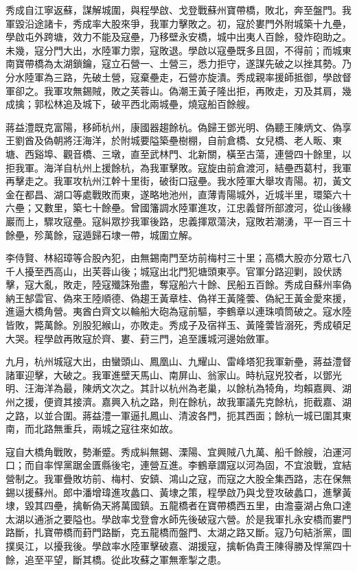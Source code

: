 \begin{pinyinscope}
秀成自江寧返蘇，謀解城圍，與程學啟、戈登戰蘇州寶帶橋，敗北，奔至盤門。我軍毀沿途諸卡，秀成率大股來爭，我軍力擊敗之。初，寇於婁門外附城築十九壘，學啟屯外跨塘，效力不能及寇壘，乃移壁永安橋，城中出夷人百餘，發炸砲助之。未幾，寇分門大出，水陸軍力禦，寇敗退。學啟以寇壘既多且固，不得前；而城東南寶帶橋為太湖鎖鑰，寇立石營一、土營三，悉力拒守，遂謀先破之以挫其勢。乃分水陸軍為三路，先破土營，寇棄壘走，石營亦旋潰。秀成親率援師抵御，學啟督軍卻之。我軍攻無錫賊，敗之芙蓉山。偽潮王黃子隆出拒，再敗走，刃及其肩，幾成擒；郭松林追及城下，破平西北兩城壘，燒寇船百餘艘。

蔣益澧既克富陽，移師杭州，康國器趨餘杭。偽歸王鄧光明、偽聽王陳炳文、偽享王劉酋及偽朝將汪海洋，於附城要隘築壘樹棚，自前倉橋、女兒橋、老人畈、東塘、西谿埠、觀音橋、三墩，直至武林門、北新關，橫至古蕩，連營四十餘里，以拒我軍。海洋自杭州上援餘杭，為我軍擊敗。寇旋由前倉渡河，結壘西葛村，我軍再擊走之。我軍攻杭州江幹十里街，破街口寇壘。我水陸軍大舉攻青陽。初，黃文金在都昌、湖口等處戰敗而東，遂略地池州，直薄青陽城外，近城半里，環築六十六壘；又數里，築七十餘壘。曾國籓調水陸軍進攻，江忠義督所部渡河，從山後緣巖而上，驟攻寇壘。寇糾眾抄我軍後路，忠義揮眾蕩決，寇敗若潮湧，平一百三十餘壘，殄萬餘，寇遁歸石埭一帶，城圍立解。

李侍賢、林紹璋等合股內犯，由無錫南門至坊前梅村三十里；高橋大股亦分眾七八千人擾至西高山，出芙蓉山後；城寇出北門犯塘頭東亭。官軍分路迎剿，設伏誘擊，寇大亂，敗走，陸寇殲誅殆盡，奪寇船六十餘、民船五百餘。秀成自蘇州率偽納王郜雲官、偽來王陸順德、偽趨王黃章桂、偽祥王黃隆蕓、偽紀王黃金愛來援，進逼大橋角營。夷酋白齊文以輪船大砲為寇前驅，李鶴章以連珠噴筒破之。寇水陸皆敗，斃萬餘。別股犯緱山，亦敗走。秀成子及宿祥玉、黃隆蕓皆溺死，秀成頓足大哭。程學啟再敗寇於齊、婁、葑三門，追至護城河邊始斂軍。

九月，杭州城寇大出，由蠻頭山、鳳凰山、九耀山、雷峰塔犯我軍新壘，蔣益澧督諸軍迎擊，大破之。我軍進壁天馬山、南屏山、翁家山。時杭寇兇狡者，以鄧光明、汪海洋為最，陳炳文次之。其計以杭州為老巢，以餘杭為犄角，均賴嘉興、湖州之援，便資其接濟。嘉興入杭之路，則在餘杭，故我軍議先克餘杭，扼截嘉、湖之路，以並合圍。蔣益澧一軍逼扎鳳山、清波各門，扼其西面；餘杭一城已圍其東南，而北路無重兵，兩城之寇往來如故。

寇自大橋角戰敗，勢漸蹙。秀成糾無錫、溧陽、宜興賊八九萬、船千餘艘，泊運河口；而自率悍黨踞金匱縣後宅，連營互進。李鶴章謂寇以河為固，不宜浪戰，宜結營制之。我軍疊敗坊前、梅村、安鎮、鴻山之寇，而寇之大股全集西路，志在保無錫以援蘇州。郎中潘增瑋進攻蠡口、黃埭之策，程學啟乃與戈登攻破蠡口，進擊黃埭，毀其四壘，擒斬偽天將萬國鎮。五龍橋者在寶帶橋西五里，由澹臺湖占魚口達太湖以通浙之要隘也。學啟率戈登會水師先後破寇六營。於是我軍扎永安橋而婁門路斷，扎寶帶橋而葑門路斷，克五龍橋而盤門、太湖之路又斷。寇乃句結浙黨，圖撲吳江，以擾我後。學啟率水陸軍擊破嘉、湖援寇，擒斬偽貴王陳得勝及悍黨四十餘，追至平望，斷其橋。從此攻蘇之軍無牽掣之患。


\end{pinyinscope}
